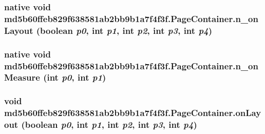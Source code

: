 \hypertarget{classmd5b60ffeb829f638581ab2bb9b1a7f4f3f_1_1_page_container_4fc5addfec5aa835740568136e2490b3}{
\subsubsection[{n\_\-onLayout}]{\setlength{\rightskip}{0pt plus 5cm}native void md5b60ffeb829f638581ab2bb9b1a7f4f3f.PageContainer.n\_\-onLayout (boolean {\em p0}, \/  int {\em p1}, \/  int {\em p2}, \/  int {\em p3}, \/  int {\em p4})}}
\label{classmd5b60ffeb829f638581ab2bb9b1a7f4f3f_1_1_page_container_4fc5addfec5aa835740568136e2490b3}


\hypertarget{classmd5b60ffeb829f638581ab2bb9b1a7f4f3f_1_1_page_container_0ab7d3b01cff4ea7d12a0e0f0ffe7968}{
\subsubsection[{n\_\-onMeasure}]{\setlength{\rightskip}{0pt plus 5cm}native void md5b60ffeb829f638581ab2bb9b1a7f4f3f.PageContainer.n\_\-onMeasure (int {\em p0}, \/  int {\em p1})}}
\label{classmd5b60ffeb829f638581ab2bb9b1a7f4f3f_1_1_page_container_0ab7d3b01cff4ea7d12a0e0f0ffe7968}


\hypertarget{classmd5b60ffeb829f638581ab2bb9b1a7f4f3f_1_1_page_container_163d7ce92b315c58198349b7f05f1a91}{
\subsubsection[{onLayout}]{\setlength{\rightskip}{0pt plus 5cm}void md5b60ffeb829f638581ab2bb9b1a7f4f3f.PageContainer.onLayout (boolean {\em p0}, \/  int {\em p1}, \/  int {\em p2}, \/  int {\em p3}, \/  int {\em p4})}}
\label{classmd5b60ffeb829f638581ab2bb9b1a7f4f3f_1_1_page_container_163d7ce92b315c58198349b7f05f1a91}


